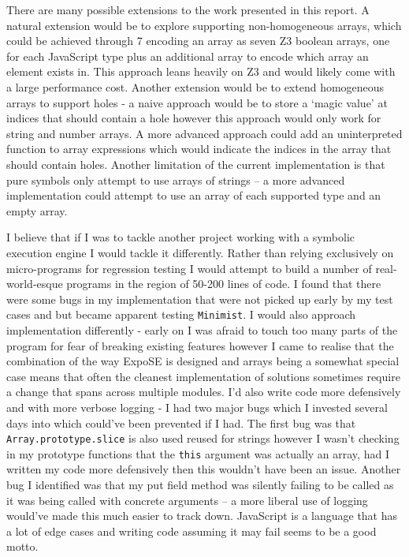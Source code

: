 \documentclass[]{final_report}
\begin{document}
There are many possible extensions to the work presented in this report. A natural extension would be to explore supporting non-homogeneous arrays, which could be achieved through 7 encoding an array as seven Z3 boolean arrays, one for each JavaScript type plus an additional array to encode which array an element exists in. This approach leans heavily on Z3 and would likely come with a large performance cost. Another extension would be to extend homogeneous arrays to support holes - a naive approach would be to store a `magic value' at indices that should contain a hole however this approach would only work for string and number arrays. A more advanced approach could add an uninterpreted function to array expressions which would indicate the indices in the array that should contain holes. Another limitation of the current implementation is that pure symbols only attempt to use arrays of strings -- a more advanced implementation could attempt to use an array of each supported type and an empty array.

I believe that if I was to tackle another project working with a symbolic execution engine I would tackle it differently. Rather than relying exclusively on micro-programs for regression testing I would attempt to build a number of real-world-esque programs in the region of 50-200 lines of code. I found that there were some bugs in my implementation that were not picked up early by my test cases and but became apparent testing \lstinline|Minimist|. I would also approach implementation differently - early on I was afraid to touch too many parts of the program for fear of breaking existing features however I came to realise that the combination of the way  ExpoSE is designed and arrays being a somewhat special case means that often the cleanest implementation of solutions sometimes require a change that spans across multiple modules. I'd also write code more defensively and with more verbose logging - I had two major bugs which I invested several days into which could've been prevented if I had. The first bug was that \lstinline|Array.prototype.slice| is also used reused for strings however I wasn't checking in my prototype functions that the \lstinline|this| argument was actually an array, had I written my code more defensively then this wouldn't have been an issue. Another bug I identified was that my put field method was silently failing to be called as it was being called with concrete arguments -- a more liberal use of logging would've made this much easier to track down. JavaScript is a language that has a lot of edge cases and  writing code assuming it may fail seems to be a good motto.
\end{document}
